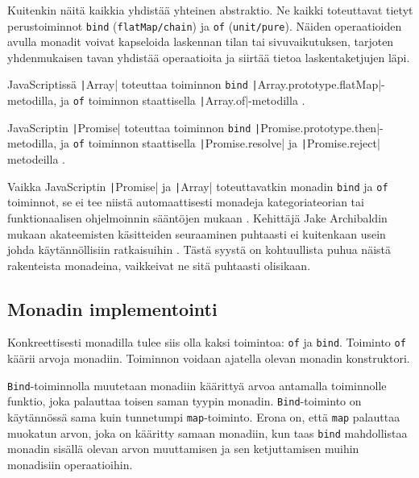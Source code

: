 Kuitenkin näitä kaikkia yhdistää yhteinen abstraktio. Ne kaikki toteuttavat tietyt perustoiminnot \texttt{bind} (\texttt{flatMap/chain}) ja \texttt{of} (\texttt{unit/pure}). Näiden operaatioiden avulla monadit voivat kapseloida laskennan tilan tai sivuvaikutuksen, tarjoten yhdenmukaisen tavan yhdistää operaatioita ja siirtää tietoa laskentaketjujen läpi.

JavaScriptissä \texttt|Array| toteuttaa toiminnon \texttt{bind} \texttt|Array.prototype.flatMap|-metodilla, ja \texttt{of} toiminnon staattisella \texttt|Array.of|-metodilla \cite{stackoverflow_flatmap_monad,stackoverflow_js_array_monad}.


JavaScriptin \texttt|Promise| toteuttaa toiminnon \texttt{bind} \texttt|Promise.prototype.then|-metodilla, ja \texttt{of} toiminnon staattisella \texttt|Promise.resolve| ja \texttt|Promise.reject| metodeilla \cite{read-it-later-11481,stackoverflow:why_monad,promises-spec-94}.

Vaikka JavaScriptin \texttt|Promise| ja \texttt|Array| toteuttavatkin monadin \texttt{bind} ja \texttt{of} toiminnot, se ei tee niistä automaattisesti monadeja kategoriateorian tai funktionaalisen ohjelmoinnin sääntöjen mukaan \cite{promises-spec-94,stackoverflow:why_monad,stackoverflow_js_array_monad}. Kehittäjä Jake Archibaldin mukaan akateemisten käsitteiden seuraaminen puhtaasti ei kuitenkaan usein johda käytännöllisiin ratkaisuihin \cite{pennane_fp_gist}. Tästä syystä on kohtuullista puhua näistä rakenteista monadeina, vaikkeivat ne sitä puhtaasti olisikaan.


\subsection{Monadin implementointi}

Konkreettisesti monadilla tulee siis olla kaksi toimintoa: \texttt{of} ja \texttt{bind}. Toiminto \texttt{of} käärii arvoja monadiin. Toiminnon voidaan ajatella olevan monadin konstruktori. \citep{stackoverflow_what_monad}

\texttt{Bind}-toiminnolla muutetaan monadiin käärittyä arvoa antamalla toiminnolle funktio, joka palauttaa toisen saman tyypin monadin. \cite{stackoverflow_what_monad} \texttt{Bind}-toiminto on käytännössä sama kuin tunnetumpi \texttt{map}-toiminto. Erona on, että \texttt{map} palauttaa muokatun arvon, joka on kääritty samaan monadiin, kun taas \texttt{bind} mahdollistaa monadin sisällä olevan arvon muuttamisen ja sen ketjuttamisen muihin monadisiin operaatioihin.

